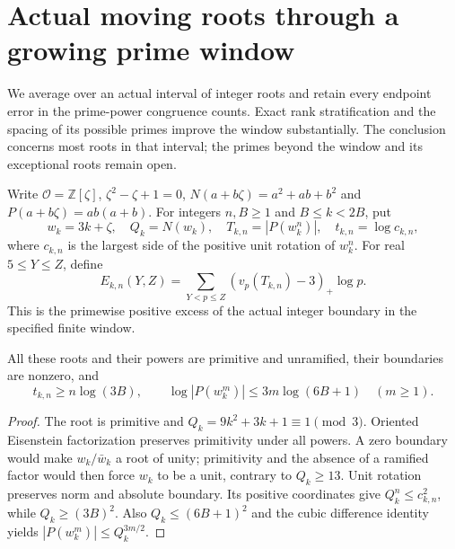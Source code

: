 \section{Actual moving roots through a growing prime window}
\label{rw-section}

We average over an actual interval of integer roots and retain every
endpoint error in the prime-power congruence counts. Exact rank
stratification and the spacing of its possible primes improve the
window substantially. The conclusion concerns most roots in that
interval; the primes beyond the window and its exceptional roots
remain open.

Write $\mathcal O=\mathbb Z[\zeta]$, $\zeta^2-\zeta+1=0$,
$N(a+b\zeta)=a^2+ab+b^2$ and $P(a+b\zeta)=ab(a+b)$.
For integers $n,B\ge1$ and $B\le k<2B$, put
\[
 w_k=3k+\zeta,\quad Q_k=N(w_k),\quad
 T_{k,n}=|P(w_k^n)|,\quad t_{k,n}=\log c_{k,n},
\]
where $c_{k,n}$ is the largest side of the positive unit rotation
of $w_k^n$. For real $5\le Y\le Z$, define
\[
 E_{k,n}(Y,Z)=\sum_{Y<p\le Z}(v_p(T_{k,n})-3)_+\log p.
\]
This is the primewise positive excess of the actual integer boundary
in the specified finite window.

\begin{lemma}\label{rw-height}
All these roots and their powers are primitive and unramified,
their boundaries are nonzero, and
\[
 t_{k,n}\ge n\log(3B),\qquad
 \log|P(w_k^m)|\le3m\log(6B+1)\quad(m\ge1).
\]
\end{lemma}
\begin{proof}
The root is primitive and $Q_k=9k^2+3k+1\equiv1\pmod3$.
Oriented Eisenstein factorization preserves primitivity under all
powers. A zero boundary would make $w_k/\bar w_k$ a root of unity;
primitivity and the absence of a ramified factor would then force
$w_k$ to be a unit, contrary to $Q_k\ge13$. Unit rotation preserves
norm and absolute boundary. Its positive coordinates give
$Q_k^n\le c_{k,n}^2$, while $Q_k\ge(3B)^2$.
Also $Q_k\le(6B+1)^2$ and the cubic difference identity yields
$|P(w_k^m)|\le Q_k^{3m/2}$.
\end{proof}

